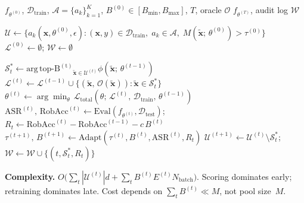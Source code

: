 \documentclass[review,1p,times,number]{elsarticle}
\begin{document}
\begin{algorithm}[htbp]
\caption{Adaptive Adversarial Active Learning (A3L)}
\label{alg:a3l}
\begin{algorithmic}[1]
\REQUIRE $f_{\theta^{(0)}}$, $\mathcal{D}_{\mathrm{train}}$,
  $\mathcal{A}{=}\{a_k\}_{k=1}^K$,
  $B^{(0)} \in [B_{\min}, B_{\max}]$,
  $T$, oracle $\mathcal{O}$
\ENSURE  $f_{\theta^{(T)}}$, audit log $\mathcal{W}$

\STATE $\mathcal{U} \leftarrow \bigl\{
  a_k(\mathbf{x},\theta^{(0)},\epsilon) :
  (\mathbf{x}, y) \!\in\! \mathcal{D}_{\mathrm{train}},\;
  a_k \!\in\! \mathcal{A},\;
  M(\tilde{\mathbf{x}};\,\theta^{(0)}) > \tau^{(0)}
  \bigr\}$
  \hfill{}
\STATE $\mathcal{L}^{(0)} \!\leftarrow\! \emptyset$;\;
  $\mathcal{W} \!\leftarrow\! \emptyset$

  \STATE $\mathcal{S}_t^* \leftarrow
    \operatorname{arg\,top\text{-}B^{(t)}}_{
    \tilde{\mathbf{x}} \in \mathcal{U}^{(t)}}
    \phi(\tilde{\mathbf{x}};\,\theta^{(t-1)})$
    \hfill{}
  \STATE $\mathcal{L}^{(t)} \leftarrow \mathcal{L}^{(t-1)} \cup
    \{(\tilde{\mathbf{x}},\, \mathcal{O}(\tilde{\mathbf{x}}))
    : \tilde{\mathbf{x}} \in \mathcal{S}_t^*\}$
  \STATE $\theta^{(t)} \leftarrow
    \arg\min_\theta\,\mathcal{L}_{\mathrm{total}}(
    \theta;\, \mathcal{L}^{(t)},\,
    \mathcal{D}_{\mathrm{train}},\, \theta^{(t-1)})$
    \hfill{}
  \STATE $\mathrm{ASR}^{(t)},\,\mathrm{RobAcc}^{(t)} \leftarrow
    \mathrm{Eval}(f_{\theta^{(t)}},
    \mathcal{D}_{\mathrm{test}})$;\;
    $R_t \leftarrow \mathrm{RobAcc}^{(t)} -
    \mathrm{RobAcc}^{(t-1)} - c\,B^{(t)}$
  \STATE $\tau^{(t+1)},\, B^{(t+1)} \leftarrow
    \mathrm{Adapt}(\tau^{(t)}, B^{(t)},
    \mathrm{ASR}^{(t)}, R_t)$
    \hfill{}
  \STATE $\mathcal{U}^{(t+1)} \!\leftarrow\!
    \mathcal{U}^{(t)} \setminus \mathcal{S}_t^*$;\;
    $\mathcal{W} \!\leftarrow\! \mathcal{W} \cup
    \{(t, \mathcal{S}_t^*, R_t)\}$
\ENDFOR
\end{algorithmic}
\end{algorithm}

\textbf{Complexity.}
$O\!\bigl(\sum_{t} |\mathcal{U}^{(t)}| d +
\sum_{t} B^{(t)} E^{(t)} N_{\mathrm{batch}}\bigr)$.
Scoring dominates early; retraining dominates late. Cost depends on
$\sum_t B^{(t)} \ll M$, not pool size~$M$.
\end{document}
